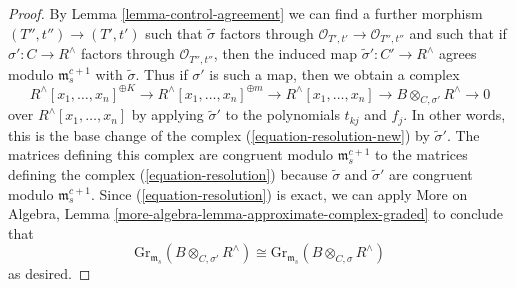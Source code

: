 \begin{proof}
\medskip\noindent
By Lemma \ref{lemma-control-agreement}
we can find a further morphism $(T'', t'') \to (T', t')$
such that $\tilde\sigma$
factors through $\mathcal{O}_{T', t'} \to \mathcal{O}_{T'', t''}$
and such that if $\sigma' : C \to R^\wedge$
factors through $\mathcal{O}_{T'', t''}$, then the induced map
$\tilde \sigma' : C' \to R^\wedge$
agrees modulo $\mathfrak m_s^{c + 1}$ with $\tilde \sigma$.
Thus if $\sigma'$ is such a map, then we obtain a complex
$$
R^\wedge[x_1, \ldots, x_n]^{\oplus K} \to
R^\wedge[x_1, \ldots, x_n]^{\oplus m} \to
R^\wedge[x_1, \ldots, x_n] \to B \otimes_{C, \sigma'} R^\wedge \to 0
$$
over $R^\wedge[x_1, \ldots, x_n]$ by applying $\tilde\sigma'$
to the polynomials $t_{kj}$ and $f_j$. In other words, this
is the base change of the complex (\ref{equation-resolution-new})
by $\tilde\sigma'$. The matrices defining this complex
are congruent modulo $\mathfrak m_s^{c + 1}$ to the matrices
defining the complex (\ref{equation-resolution}) because
$\tilde \sigma$ and $\tilde \sigma'$ are congruent modulo
$\mathfrak m_s^{c + 1}$. Since (\ref{equation-resolution}) is exact,
we can apply
More on Algebra, Lemma \ref{more-algebra-lemma-approximate-complex-graded}
to conclude that
$$
\text{Gr}_{\mathfrak m_s}(B \otimes_{C, \sigma'} R^\wedge)
\cong
\text{Gr}_{\mathfrak m_s}(B \otimes_{C, \sigma} R^\wedge)
$$
as desired.
\end{proof}
